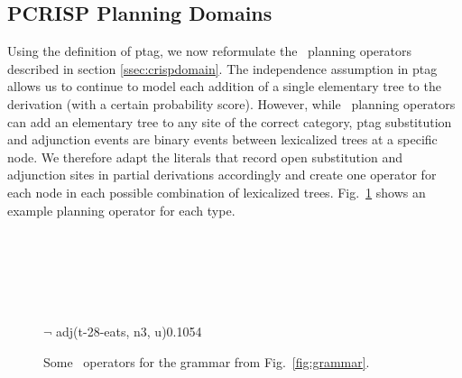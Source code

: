 \subsection{PCRISP Planning Domains}
\label{ssec:pcrisp-domains}
Using the definition of {\sc ptag}, we now reformulate the \crisp\ planning operators described in section \ref{ssec:crispdomain}.
The independence assumption in {\sc ptag} allows us to continue to model each addition of a single elementary tree to the derivation (with a certain probability score). However, while \crisp\ planning operators can add an elementary tree to any site of the correct category, {\sc ptag} substitution and adjunction events are binary events between lexicalized trees at a specific node. We therefore adapt the literals that record open substitution and adjunction sites in partial derivations accordingly and create one operator for each node in each possible combination of lexicalized trees.
Fig.~\ref{example-action} shows an example planning operator for each type.
\begin{figure}[t]
\begin{center}
\\\smallskip

\\\smallskip

\\\smallskip

{$\lnot$ adj(t-28-eats, n3, u)}{0.1054}\\\smallskip

\caption{\label{example-action} Some \pcrisp\ operators for the grammar from Fig.~\ref{fig:grammar}.}
\end{center}
\end{figure}

